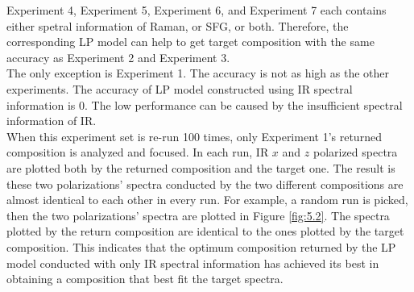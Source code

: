 Experiment 4, Experiment 5, Experiment 6, and Experiment 7 each contains either spetral information of Raman, or SFG, or both. Therefore, the corresponding LP model can help to get target composition with the same accuracy as Experiment 2 and Experiment 3. \\

The only exception is Experiment 1. The accuracy is not as high as the other experiments. The accuracy of LP model constructed using IR spectral information is $0$. The low performance can be caused by the insufficient spectral information of IR. \\

When this experiment set is re-run 100 times, only Experiment 1's returned composition is analyzed and focused. In each run, IR $x$ and $z$ polarized spectra are plotted both by the returned composition and the target one. The result is these two polarizations' spectra conducted by the two different compositions are almost identical to each other in every run. For example, a random run is picked, then the two polarizations' spectra are plotted in Figure \ref{fig:5.2}. The spectra plotted by the return composition are identical to the ones plotted by the target composition. This indicates that the optimum composition returned by the LP model conducted with only IR spectral information has achieved its best in obtaining a composition that best fit the target spectra. 

